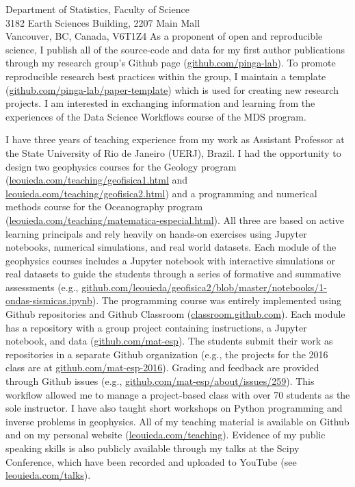 \documentclass[11pt]{letter}
\begin{document}
\begin{letter}{
    Department of Statistics, Faculty of Science
    \\
    3182 Earth Sciences Building, 2207 Main Mall
    \\
    Vancouver, BC, Canada, V6T1Z4
}
As a proponent of open and reproducible science, I publish all of the
source-code and data for my first author publications through my research
group's Github page
(\href{https://github.com/pinga-lab}{github.com/pinga-lab}).
To promote reproducible research best practices within the group,
I maintain a template
(\href{https://github.com/pinga-lab/paper-template}{github.com/pinga-lab/paper-template})
which is used for creating new research projects.
I am interested in exchanging information and learning from the experiences of
the Data Science Workflows course of the MDS program.


I have three years of teaching experience from my work as Assistant Professor
at the State University of Rio de Janeiro (UERJ), Brazil.
I had the opportunity to design two geophysics courses for the Geology
program
(\href{http://www.leouieda.com/teaching/geofisica1.html}{leouieda.com/teaching/geofisica1.html}
and
\href{http://www.leouieda.com/teaching/geofisica2.html}{leouieda.com/teaching/geofisica2.html})
and a programming and numerical methods course for the Oceanography
program
(\href{http://www.leouieda.com/teaching/matematica-especial.html}{leouieda.com/teaching/matematica-especial.html}).
All three are based on active learning principals and rely heavily on hands-on
exercises using Jupyter notebooks, numerical simulations, and real world
datasets.
Each module of the geophysics courses includes a Jupyter notebook with
interactive simulations or real datasets to guide the students through a
series of formative and summative assessments
(e.g.,
\href{https://github.com/leouieda/geofisica2/blob/master/notebooks/1-ondas-sismicas.ipynb}{github.com/leouieda/geofisica2/blob/master/notebooks/1-ondas-sismicas.ipynb}).
The programming course was entirely implemented using Github repositories and
Github Classroom (\href{https://classroom.github.com/}{classroom.github.com}).
Each module has a repository with a group project containing instructions, a
Jupyter notebook, and data
(\href{https://github.com/mat-esp}{github.com/mat-esp}).
The students submit their work as repositories in a separate Github
organization
(e.g., the projects for the
2016 class are at
\href{https://github.com/mat-esp-2016}{github.com/mat-esp-2016}).
Grading and feedback are provided through Github issues (e.g.,
\href{https://github.com/mat-esp/about/issues/259}{github.com/mat-esp/about/issues/259}).
This workflow allowed me to manage a project-based class with over 70 students
as the sole instructor.
I have also taught short workshops on Python programming and inverse problems
in geophysics.
All of my teaching material is available on Github and on my personal website
(\href{http://www.leouieda.com/teaching/}{leouieda.com/teaching}).
Evidence of my public speaking skills is also publicly available through my
talks at the Scipy Conference, which have been recorded and uploaded to YouTube
(see \href{http://www.leouieda.com/talks/}{leouieda.com/talks}).



\end{letter}
\end{document}
